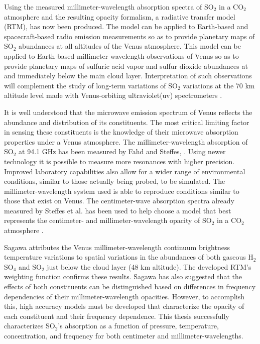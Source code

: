 Using the measured millimeter-wavelength absorption spectra of SO$_2$ in a CO$_2$ atmosphere and the resulting opacity formalism, a radiative transfer model (RTM), has now been produced. The model can be applied to Earth-based and spacecraft-based radio emission measurements so as to provide planetary maps of SO$_2$ abundances at all altitudes of the Venus atmosphere. %
This model can be applied to Earth-based millimeter-wavelength observations of Venus so as to provide planetary maps of sulfuric acid vapor and sulfur dioxide abundances at and immediately below the main cloud layer. Interpretation of such observations will complement the study of long-term variations of SO$_2$ variations at the 70 km altitude level made with Venus-orbiting ultraviolet(uv) spectrometers \cite{Esposito-2012}. 

It is well understood that the microwave emission spectrum of Venus reflects the abundance and distribution of its constituents. The most critical limiting factor in sensing these constituents is the knowledge of their microwave absorption properties under a Venus atmosphere. 
The millimeter-wavelength absorption of SO$_2$ at 94.1 GHz has been measured by Fahd and Steffes, \cite{Fahd-thesis}. 
Using newer technology it is possible to measure more resonances with higher precision. Improved laboratory capabilities also allow for a wider range of environmental conditions, similar to those actually being probed, to be simulated. The millimeter-wavelength system used is able to reproduce conditions similar to those that exist on Venus. The centimeter-wave absorption spectra already measured by Steffes et al. \cite{Steffes-2014} has been used to help choose a model that best represents the centimeter- and millimeter-wavelength opacity of SO$_2$ in a CO$_2$ atmosphere \cite{Butler-2001}. 

Sagawa \cite{Sagawa-2008} attributes the Venus millimeter-wavelength continuum brightness temperature variations to spatial variations in the abundances of both gaseous H$_2$SO$_4$ and SO$_2$ just below the cloud layer (48 km altitude). The developed RTM's weighting function confirms these results. Sagawa has also suggested that the effects of both constituents can be distinguished based on differences in frequency dependencies of their millimeter-wavelength opacities. However, to accomplish this, high accuracy models must be developed that characterize the opacity of each constituent and their frequency dependence. This thesis successfully characterizes SO$_2$'s absorption as a function of pressure, temperature, concentration, and frequency for both centimeter and millimeter-wavelengths. 


